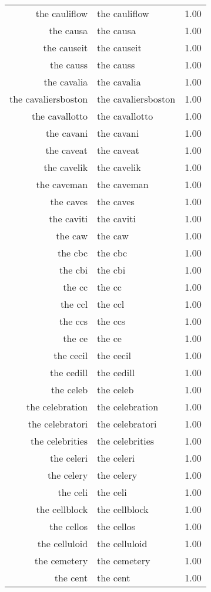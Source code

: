 \begin{table}[ht]
\begin{tabular}{rlr}
  the cauliflow & the cauliflow & 1.00 \\ 
  the causa & the causa & 1.00 \\ 
  the causeit & the causeit & 1.00 \\ 
  the causs & the causs & 1.00 \\ 
  the cavalia & the cavalia & 1.00 \\ 
  the cavaliersboston & the cavaliersboston & 1.00 \\ 
  the cavallotto & the cavallotto & 1.00 \\ 
  the cavani & the cavani & 1.00 \\ 
  the caveat & the caveat & 1.00 \\ 
  the cavelik & the cavelik & 1.00 \\ 
  the caveman & the caveman & 1.00 \\ 
  the caves & the caves & 1.00 \\ 
  the caviti & the caviti & 1.00 \\ 
  the caw & the caw & 1.00 \\ 
  the cbc & the cbc & 1.00 \\ 
  the cbi & the cbi & 1.00 \\ 
  the cc & the cc & 1.00 \\ 
  the ccl & the ccl & 1.00 \\ 
  the ccs & the ccs & 1.00 \\ 
  the ce & the ce & 1.00 \\ 
  the cecil & the cecil & 1.00 \\ 
  the cedill & the cedill & 1.00 \\ 
  the celeb & the celeb & 1.00 \\ 
  the celebration & the celebration & 1.00 \\ 
  the celebratori & the celebratori & 1.00 \\ 
  the celebrities & the celebrities & 1.00 \\ 
  the celeri & the celeri & 1.00 \\ 
  the celery & the celery & 1.00 \\ 
  the celi & the celi & 1.00 \\ 
  the cellblock & the cellblock & 1.00 \\ 
  the cellos & the cellos & 1.00 \\ 
  the celluloid & the celluloid & 1.00 \\ 
  the cemetery & the cemetery & 1.00 \\ 
  the cent & the cent & 1.00 \\ 

\end{tabular}
\end{table}
